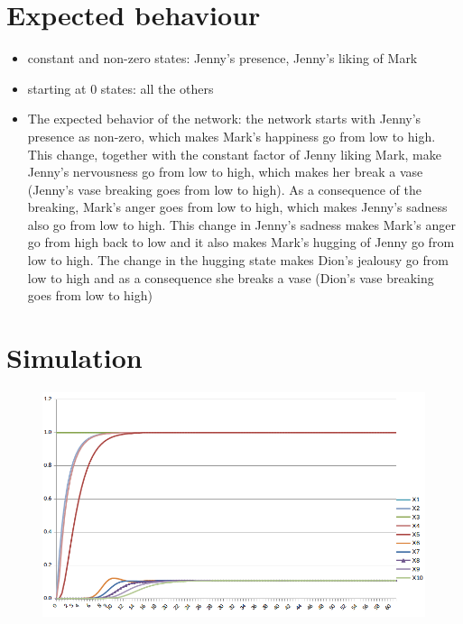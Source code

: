 \documentclass[a4paper]{article}
\begin{document}
\section{Expected behaviour}
 \begin{itemize}
\item constant and non-zero states:  Jenny's presence, Jenny's liking of Mark
\item starting at 0 states: all the others
\item The expected behavior of the network: the network starts with Jenny's presence as non-zero, which makes Mark's happiness go from low to high. This change, together with the constant factor of Jenny liking Mark, make Jenny's nervousness go from low to high, which makes her break a vase (Jenny's vase breaking goes from low to high). As a consequence of the breaking, Mark's anger goes from low to high, which makes Jenny's sadness also go from low to high. This change in Jenny's sadness makes Mark's anger go from high back to low and it also makes Mark's hugging of Jenny go from low to high. The change in the hugging state makes Dion's jealousy go from low to high and as a consequence she breaks a vase (Dion's vase breaking goes from low to high)
\end{itemize}





\section{Simulation}

\begin{figure}[!htbp]
\center
\includegraphics[width=\textwidth]{res/img/numerical_representation}
\end{figure}




\end{document}
